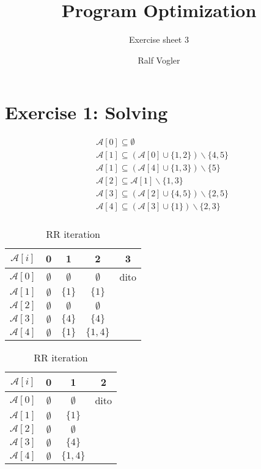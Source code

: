 \documentclass[11pt,a4paper]{scrartcl}
\begin{document}
\author{Ralf Vogler}
\title{Program Optimization}
\subtitle{Exercise sheet 3}

\maketitle

\section*{Exercise 1: Solving}
\begin{minipage}{0.4\textwidth}
\begin{align*}
&\mathcal{A}[0] \subseteq \emptyset\\
&\mathcal{A}[1] \subseteq (\mathcal{A}[0] \cup \{1,2\}) \backslash \{4,5\}\\
&\mathcal{A}[1] \subseteq (\mathcal{A}[4] \cup \{1,3\}) \backslash \{5\}\\
&\mathcal{A}[2] \subseteq \mathcal{A}[1] \backslash \{1,3\}\\
&\mathcal{A}[3] \subseteq (\mathcal{A}[2] \cup \{4,5\}) \backslash \{2,5\}\\
&\mathcal{A}[4] \subseteq (\mathcal{A}[3] \cup \{1\}) \backslash \{2,3\}\\
\end{align*}
\end{minipage}
\begin{table}[h]
\begin{minipage}{0.4\textwidth}
\begin{tabular}{c|c|c|c|c}
$\mathcal{A}[i]$ & 0 & 1 & 2 & 3 \\ \hline
$\mathcal{A}[0]$ & $\emptyset$ & $\emptyset$ & $\emptyset$ & dito \\
$\mathcal{A}[1]$ & $\emptyset$ & $\{1\}$ & $\{1\}$ \\
$\mathcal{A}[2]$ & $\emptyset$ & $\emptyset$ & $\emptyset$ \\
$\mathcal{A}[3]$ & $\emptyset$ & $\{4\}$ & $\{4\}$ \\
$\mathcal{A}[4]$ & $\emptyset$ & $\{1\}$ & $\{1,4\}$ \\
\end{tabular}
\caption{Naive iteration}
\end{minipage}
\begin{minipage}{0.3\textwidth}
\begin{tabular}{c|c|c|c}
$\mathcal{A}[i]$ & 0 & 1 & 2 \\ \hline
$\mathcal{A}[0]$ & $\emptyset$ & $\emptyset$ & dito \\
$\mathcal{A}[1]$ & $\emptyset$ & $\{1\}$ \\
$\mathcal{A}[2]$ & $\emptyset$ & $\emptyset$ \\
$\mathcal{A}[3]$ & $\emptyset$ & $\{4\}$ \\
$\mathcal{A}[4]$ & $\emptyset$ & $\{1,4\}$ \\
\end{tabular}
\caption{RR iteration}
\end{minipage}
\end{table}
\end{document}
